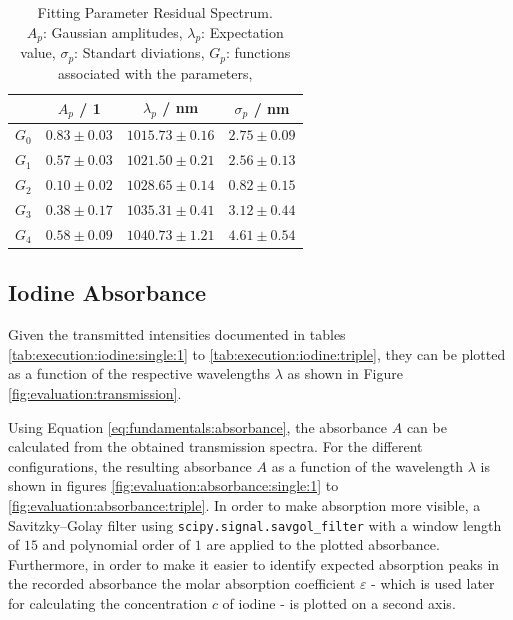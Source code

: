 \begin{table}[H]
        \label{}
        \centering
        \caption{Fitting Parameter Residual Spectrum. \\
        $A_p$: Gaussian amplitudes,
        $\lambda_p$: Expectation value,
        $\sigma_p$: Standart diviations,
        $G_p$: functions associated with the parameters,}
        \begin{tabular}{c|ccc} \hline
            &  $A_p$ / 1 &  $\lambda_p$ / nm & $\sigma_p$ / nm  \\ \hline  \hline 
        $G_0$&$0.83 \pm 0.03$&$1015.73 \pm 0.16$&$2.75 \pm 0.09$\\ \hline
        $G_1$&$0.57 \pm 0.03$&$1021.50 \pm 0.21$&$2.56 \pm 0.13$\\ \hline
        $G_2$&$0.10 \pm 0.02$&$1028.65 \pm 0.14$&$0.82 \pm 0.15$\\ \hline
        $G_3$&$0.38 \pm 0.17$&$1035.31 \pm 0.41$&$3.12 \pm 0.44$\\ \hline
        $G_4$&$0.58 \pm 0.09$&$1040.73 \pm 1.21$&$4.61 \pm 0.54$\\ \hline
        \end{tabular}
\end{table}   
    
\subsection{Iodine Absorbance}
\label{sec:evaluation:iodine-absorbance}

Given the transmitted intensities documented in tables \ref{tab:execution:iodine:single:1} to \ref{tab:execution:iodine:triple}, they can be plotted as a function of the respective wavelengths $\lambda$ as shown in Figure \ref{fig:evaluation:transmission}.

Using Equation \ref{eq:fundamentals:absorbance}, the absorbance $A$ can be calculated from the obtained transmission spectra. For the different configurations, the resulting absorbance $A$ as a function of the wavelength $\lambda$ is shown in figures \ref{fig:evaluation:absorbance:single:1} to \ref{fig:evaluation:absorbance:triple}. In order to make absorption more visible, a Savitzky–Golay filter using \verb|scipy.signal.savgol_filter| with a window length of $15$ and polynomial order of $1$ are applied to the plotted absorbance. Furthermore, in order to make it easier to identify expected absorption peaks in the recorded absorbance the molar absorption coefficient $\varepsilon$ - which is used later for calculating the concentration $c$ of iodine - is plotted on a second axis.

